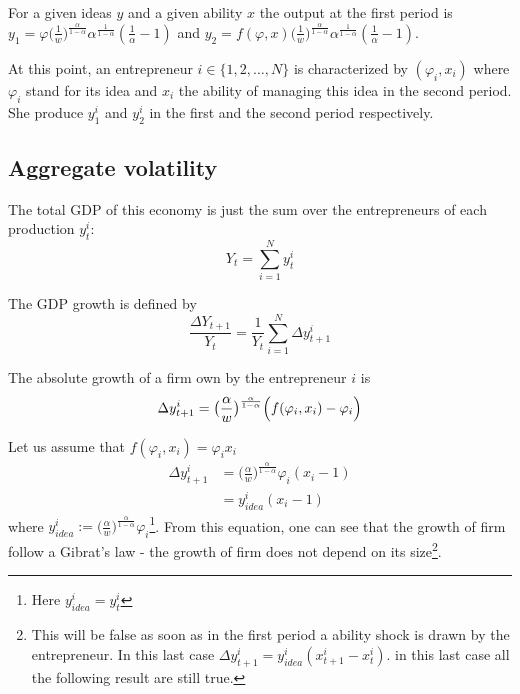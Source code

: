 \documentclass[12pt]{article}
\begin{document}
For a given ideas $y$ and a given ability $x$ the output at the first period is $y_1 = \varphi \big( \frac{1}{w} \big)^{\frac{\alpha}{1-\alpha}} \alpha^{\frac{1}{1-\alpha}} (\frac{1}{\alpha}-1)$ and $y_2 = f(\varphi, x) \big( \frac{1}{w} \big)^{\frac{\alpha}{1-\alpha}} \alpha^{\frac{1}{1-\alpha}} (\frac{1}{\alpha}-1)$.

At this point, an entrepreneur $i\in \{1,2,\ldots, N\}$ is characterized by $(\varphi_i,x_i)$ where $\varphi_i$ stand for its idea and $x_i$ the ability of managing this idea in the second period. She produce $y_1^i$ and $y_2^i$ in the first and the second period respectively.

\subsection{Aggregate volatility}

The total GDP of this economy is just the sum over the entrepreneurs of each production $y_t^i$:
\begin{equation*}
 Y_t = \sum_{i=1}^N y_t^i
\end{equation*}


The GDP growth is defined by
\begin{equation*}
\frac{\Delta Y_{t+1}}{Y_t} = \frac{1}{Y_t} \sum_{i=1}^N  \Delta y^i_{t+1}
\end{equation*}

The absolute growth of a firm own by the entrepreneur $i$ is 
\begin{equation*}
\Delta y^i_{t+1}=  \big( \frac{\alpha}{w} \big)^{\frac{\alpha}{1-\alpha}} \Big(  f(\varphi_i,x_i) -\varphi_i \Big)\\
\end{equation*}

Let us assume that $f(\varphi_i,x_i) = \varphi_i  x_i$
\begin{align*}
\Delta y^i_{t+1}&=  \Big( \frac{\alpha}{w} \Big)^{\frac{\alpha}{1-\alpha}} \varphi_i ( x_i - 1 )\\
 &= y^i_{idea} ( x_i - 1 )
\end{align*}
where $y^i_{idea} := \Big( \frac{\alpha}{w} \Big)^{\frac{\alpha}{1-\alpha}} \varphi_i$\footnote{Here $ y^i_{idea}= y^i_t$}. From this equation, one can see that the growth of firm follow a Gibrat's law - the growth of firm does not depend on its size\footnote{This will be false as soon as in the first period a ability shock is drawn by the entrepreneur. In this last case $\Delta y^i_{t+1} = y^i_{idea} ( x^i_{t+1} - x^i_t )$. in this last case all the following result are still true.}.
\end{document}
